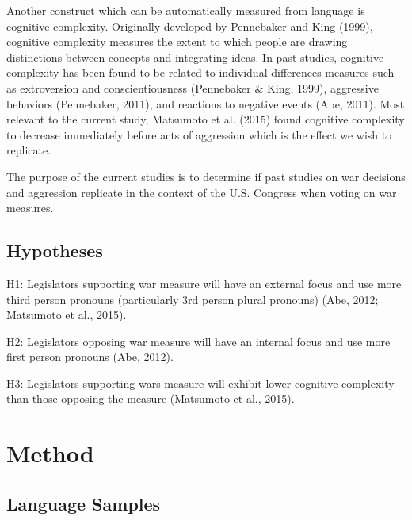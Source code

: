 \documentclass[english,,man,floatsintext]{apa6}
\begin{document}
Another construct which can be automatically measured from language is cognitive complexity. Originally developed by Pennebaker and King (1999), cognitive complexity measures the extent to which people are drawing distinctions between concepts and integrating ideas. In past studies, cognitive complexity has been found to be related to individual differences measures such as extroversion and conscientiousness (Pennebaker \& King, 1999), aggressive behaviors (Pennebaker, 2011), and reactions to negative events (Abe, 2011). Most relevant to the current study, Matsumoto et al. (2015) found cognitive complexity to decrease immediately before acts of aggression which is the effect we wish to replicate.

The purpose of the current studies is to determine if past studies on war decisions and aggression replicate in the context of the U.S. Congress when voting on war measures.

\hypertarget{hypotheses}{%
\subsection{Hypotheses}\label{hypotheses}}

H1: Legislators supporting war measure will have an external focus and use more third person pronouns (particularly 3rd person plural pronouns) (Abe, 2012; Matsumoto et al., 2015).

H2: Legislators opposing war measure will have an internal focus and use more first person pronouns (Abe, 2012).

H3: Legislators supporting wars measure will exhibit lower cognitive complexity than those opposing the measure (Matsumoto et al., 2015).

\hypertarget{method}{%
\section{Method}\label{method}}

\hypertarget{language-samples}{%
\subsection{Language Samples}\label{language-samples}}
\end{document}
